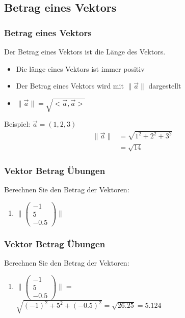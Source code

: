 \subsection{Betrag eines Vektors}
\begin{frame}
    \frametitle{Betrag eines Vektors}
    Der Betrag eines Vektors ist die Länge des Vektors.
    \begin{itemize}
	    \item Die länge eines Vektors ist immer positiv
	    \item Der Betrag eines Vektors wird mit $\lVert \vec{a} \rVert$ dargestellt
	\item $\lVert \vec{a} \rVert = \sqrt{<\vec{a}, \vec{a}>}$
    \end{itemize}
        Beispiel: $\vec{a} = (1,2,3)$
	\begin{align*}
		\lVert \vec{a} \rVert &= \sqrt{1^2 + 2^2 + 3^2} \\
		&= \sqrt{14}
	\end{align*}
\end{frame}

\begin{frame}
    \frametitle{Vektor Betrag Übungen}
	Berechnen Sie den Betrag der Vektoren:
	\begin{enumerate}
		\item $\lVert \begin{pmatrix} -1 \\ 5 \\ -0.5 \end{pmatrix} \rVert$
	\end{enumerate}
\end{frame}

\begin{frame}
    \frametitle{Vektor Betrag Übungen}
	Berechnen Sie den Betrag der Vektoren:
	\begin{enumerate}
		\item $\lVert \begin{pmatrix} -1 \\ 5 \\ -0.5 \end{pmatrix} \rVert = $ \\
		$ $\\
		$ \sqrt{(-1)^2 + 5^2 + (-0.5)^2} = \sqrt{26.25} = 5.124$
	\end{enumerate}
\end{frame}

